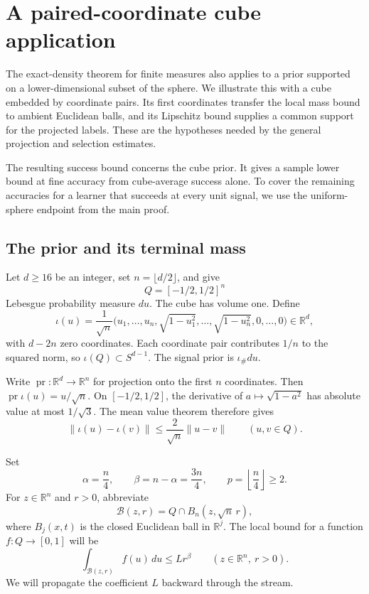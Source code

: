 \section{A paired-coordinate cube application}\label{h:cube:section}

The exact-density theorem for finite measures also applies to a prior
supported on a lower-dimensional subset of the sphere.  We illustrate
this with a cube embedded by coordinate pairs.  Its first coordinates
transfer the local mass bound to ambient Euclidean balls, and its
Lipschitz bound supplies a common support for the projected labels.
These are the hypotheses needed by the general projection and selection
estimates.

The resulting success bound concerns the cube prior.  It gives a
sample lower bound at fine accuracy from cube-average success alone.
To cover the remaining accuracies for a learner that succeeds at every
unit signal, we use the uniform-sphere endpoint from the main proof.

\subsection{The prior and its terminal mass}

Let \(d\ge16\) be an integer, set \(n=\lfloor d/2\rfloor\), and give
\[
 Q=[-1/2,1/2]^n
\]
Lebesgue probability measure \(du\).  The cube has volume one.  Define
\begin{equation}\label{h:cube:map}
 \iota(u)=\frac1{\sqrt n}
 \bigl(u_1,\ldots,u_n,\sqrt{1-u_1^2},\ldots,
       \sqrt{1-u_n^2},0,\ldots,0\bigr)\in\mathbb R^d,
\end{equation}
with \(d-2n\) zero coordinates.  Each coordinate pair contributes
\(1/n\) to the squared norm, so \(\iota(Q)\subset S^{d-1}\).
The signal prior is \(\iota_\#du\).

Write \(\operatorname{pr}:\mathbb R^d\to\mathbb R^n\) for projection
onto the first \(n\) coordinates.  Then
\(\operatorname{pr}\iota(u)=u/\sqrt n\).  On \([-1/2,1/2]\), the
derivative of \(a\mapsto\sqrt{1-a^2}\) has absolute value at most
\(1/\sqrt3\).  The mean value theorem therefore gives
\begin{equation}\label{h:cube:lipschitz}
 \|\iota(u)-\iota(v)\|\le\frac2{\sqrt n}\|u-v\|
 \qquad(u,v\in Q).
\end{equation}

Set
\begin{equation}\label{h:cube:parameters}
 \alpha=\frac n4,\qquad \beta=n-\alpha=\frac{3n}{4},
 \qquad p=\left\lfloor\frac n4\right\rfloor\ge2.
\end{equation}
For \(z\in\mathbb R^n\) and \(r>0\), abbreviate
\[
 \mathcal B(z,r)=Q\cap B_n(z,\sqrt n\,r),
\]
where \(B_j(x,t)\) is the closed Euclidean ball in \(\mathbb R^j\).
The local bound for a function \(f:Q\to[0,1]\) will be
\begin{equation}\label{h:cube:local}
 \int_{\mathcal B(z,r)}f(u)\,du\le Lr^\beta
 \qquad(z\in\mathbb R^n,\ r>0).
\end{equation}
We will propagate the coefficient \(L\) backward through the stream.

